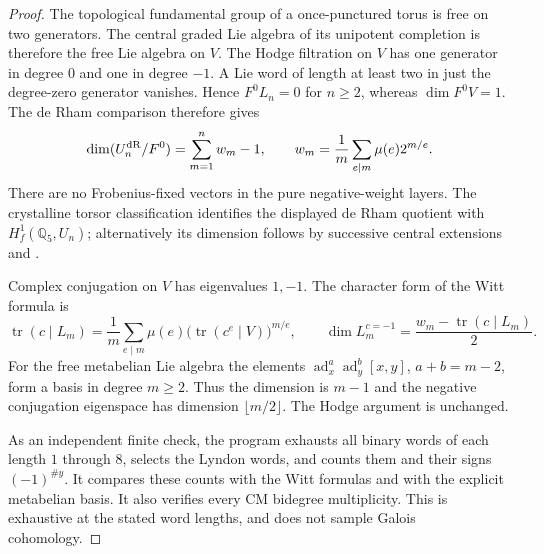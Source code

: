 \begin{proof}
The topological fundamental group of a once-punctured torus is free on
two generators. The central graded Lie algebra of its unipotent
completion is therefore the free Lie algebra on $V$. The Hodge
filtration on $V$ has one generator in degree $0$ and one in degree
$-1$. A Lie word of length at least two in just the degree-zero
generator vanishes. Hence $F^0L_n=0$ for $n\ge2$, whereas
$\dim F^0V=1$. The de Rham comparison therefore gives
\[
 \dim(U_n^{\rm dR}/F^0)=\sum_{m=1}^n w_m-1,
 \qquad w_m=\frac1m\sum_{e\mid m}\mu(e)2^{m/e}.
\]
There are no Frobenius-fixed vectors in the pure negative-weight
layers. The crystalline torsor classification identifies the displayed
de Rham quotient with $H_f^1(\mathbb Q_5,U_n)$; alternatively its
dimension follows by successive central extensions and
\citet[Corollary 3.1.11]{FE_Betts2023}.

Complex conjugation on $V$ has eigenvalues $1,-1$. The character form
of the Witt formula is
\[
 \operatorname{tr}(c\mid L_m)
 =\frac1m\sum_{e\mid m}\mu(e)
       \bigl(\operatorname{tr}(c^e\mid V)\bigr)^{m/e},
 \qquad
 \dim L_m^{c=-1}=\frac{w_m-\operatorname{tr}(c\mid L_m)}2.
\]
For the free metabelian Lie algebra the elements
$\operatorname{ad}_x^a\operatorname{ad}_y^b[x,y]$, $a+b=m-2$,
form a basis in degree $m\ge2$. Thus the dimension is $m-1$ and the
negative conjugation eigenspace has dimension $\lfloor m/2\rfloor$.
The Hodge argument is unchanged.

As an independent finite check, the program exhausts all binary words
of each length $1$ through $8$, selects the Lyndon words, and counts
them and their signs $(-1)^{\#y}$. It compares these counts with the
Witt formulas and with the explicit metabelian basis. It also verifies
every CM bidegree multiplicity. This is exhaustive at the stated word
lengths, and does not sample Galois cohomology.
\end{proof}

